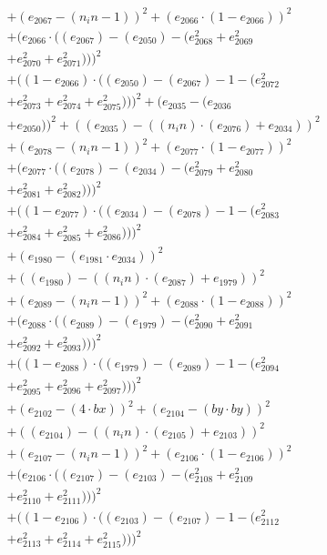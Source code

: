 \documentclass[10pt, a4paper]{article}
\begin{document}
\begin{small}
\begin{align*}
& + (e_{2067} - (n_in - 1))^{2} + (e_{2066}  \cdot  (1 - e_{2066}))^{2} \\
& + (e_{2066}  \cdot  ((e_{2067}) - (e_{2050}) - (e_{2068}^{2} + e_{2069}^{2} \\
& + e_{2070}^{2} + e_{2071}^{2})))^{2} \\
& + ((1 - e_{2066})  \cdot  ((e_{2050}) - (e_{2067}) - 1 - (e_{2072}^{2} \\
& + e_{2073}^{2} + e_{2074}^{2} + e_{2075}^{2})))^{2} + (e_{2035} - (e_{2036} \\
& + e_{2050}))^{2} + ((e_{2035}) - ((n_in)  \cdot  (e_{2076}) + e_{2034}))^{2} \\
& + (e_{2078} - (n_in - 1))^{2} + (e_{2077}  \cdot  (1 - e_{2077}))^{2} \\
& + (e_{2077}  \cdot  ((e_{2078}) - (e_{2034}) - (e_{2079}^{2} + e_{2080}^{2} \\
& + e_{2081}^{2} + e_{2082}^{2})))^{2} \\
& + ((1 - e_{2077})  \cdot  ((e_{2034}) - (e_{2078}) - 1 - (e_{2083}^{2} \\
& + e_{2084}^{2} + e_{2085}^{2} + e_{2086}^{2})))^{2} \\
& + (e_{1980} - (e_{1981}  \cdot  e_{2034}))^{2} \\
& + ((e_{1980}) - ((n_in)  \cdot  (e_{2087}) + e_{1979}))^{2} \\
& + (e_{2089} - (n_in - 1))^{2} + (e_{2088}  \cdot  (1 - e_{2088}))^{2} \\
& + (e_{2088}  \cdot  ((e_{2089}) - (e_{1979}) - (e_{2090}^{2} + e_{2091}^{2} \\
& + e_{2092}^{2} + e_{2093}^{2})))^{2} \\
& + ((1 - e_{2088})  \cdot  ((e_{1979}) - (e_{2089}) - 1 - (e_{2094}^{2} \\
& + e_{2095}^{2} + e_{2096}^{2} + e_{2097}^{2})))^{2} \\
& + (e_{2102} - (4  \cdot  bx))^{2} + (e_{2104} - (by  \cdot  by))^{2} \\
& + ((e_{2104}) - ((n_in)  \cdot  (e_{2105}) + e_{2103}))^{2} \\
& + (e_{2107} - (n_in - 1))^{2} + (e_{2106}  \cdot  (1 - e_{2106}))^{2} \\
& + (e_{2106}  \cdot  ((e_{2107}) - (e_{2103}) - (e_{2108}^{2} + e_{2109}^{2} \\
& + e_{2110}^{2} + e_{2111}^{2})))^{2} \\
& + ((1 - e_{2106})  \cdot  ((e_{2103}) - (e_{2107}) - 1 - (e_{2112}^{2} \\
& + e_{2113}^{2} + e_{2114}^{2} + e_{2115}^{2})))^{2} \\

\end{align*}
\end{small}
\end{document}
